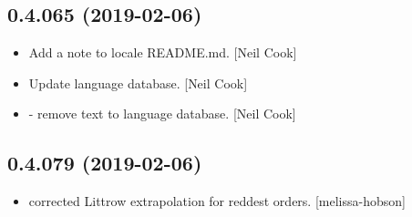 \documentclass[a4paper,10pt,english]{report}
\begin{document}
\subsection{0.4.065 (2019-02-06)}
\label{\detokenize{misc/changelog:id192}}\begin{itemize}
\item {} 
Add a note to locale README.md. {[}Neil Cook{]}

\item {} 
Update language database. {[}Neil Cook{]}

\item {} 
 - remove text to language database. {[}Neil Cook{]}

\end{itemize}


\subsection{0.4.079 (2019-02-06)}
\label{\detokenize{misc/changelog:id193}}\begin{itemize}
\item {} 
 corrected Littrow extrapolation for reddest orders.
{[}melissa-hobson{]}

\end{itemize}
\end{document}
